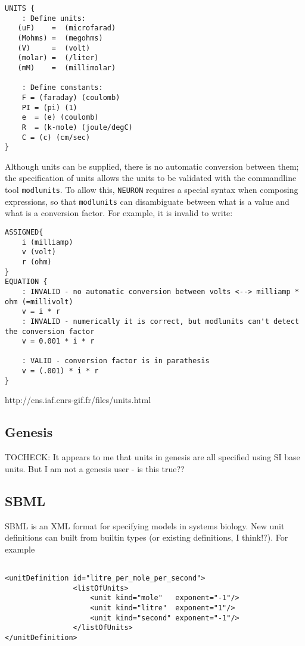 \documentclass{article}
\begin{document}
\begin{verbatim}
UNITS {
    : Define units:
   (uF)    =  (microfarad)
   (Mohms) =  (megohms)
   (V)     =  (volt)
   (molar) =  (/liter)
   (mM)    =  (millimolar)
    
    : Define constants:
    F = (faraday) (coulomb)
    PI = (pi) (1)
    e  = (e) (coulomb)
    R  = (k-mole) (joule/degC)
    C = (c) (cm/sec)
}
\end{verbatim}



Although units can be supplied, there is no automatic conversion between them; the specification of units allows the units to be validated with the commandline tool \verb|modlunits|. To allow this, \verb|NEURON| requires a special syntax when composing expressions, so that \verb|modlunits| can disambiguate between what is a value and what is a conversion factor. For example, it is invalid to write:
\begin{verbatim}
ASSIGNED{
    i (milliamp)
    v (volt) 
    r (ohm)
}
EQUATION {
    : INVALID - no automatic conversion between volts <--> milliamp * ohm (=millivolt)
    v = i * r 
    : INVALID - numerically it is correct, but modlunits can't detect the conversion factor
    v = 0.001 * i * r

    : VALID - conversion factor is in parathesis
    v = (.001) * i * r
}
\end{verbatim}

http://cns.iaf.cnrs-gif.fr/files/units.html



\subsection*{Genesis}
TOCHECK: It appears to me that units in genesis are all specified using SI base units. But  I am not a genesis user - is this true??


\subsection*{SBML}
SBML is an XML format for specifying models in systems biology. New unit definitions can built from builtin types (or existing definitions, I think!?).
For example

\begin{lstlisting}

<unitDefinition id="litre_per_mole_per_second">
                <listOfUnits>
                    <unit kind="mole"   exponent="-1"/>
                    <unit kind="litre"  exponent="1"/>
                    <unit kind="second" exponent="-1"/>
                </listOfUnits>
</unitDefinition>
\end{lstlisting}
\end{document}

